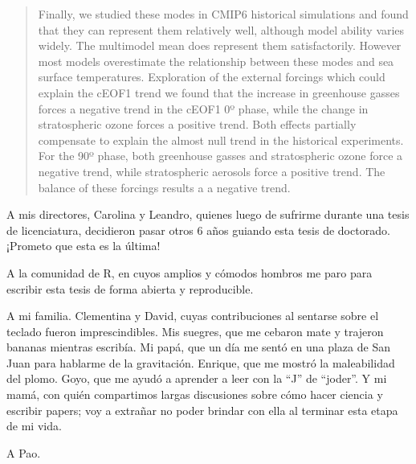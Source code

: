 \documentclass[12pt,oneside,a4paper]{reedthesis}
\begin{document}
\begin{abstract}
    Finally, we studied these modes in CMIP6 historical simulations and found that they can represent them relatively well, although model ability varies widely.
    The multimodel mean does represent them satisfactorily.
    However most models overestimate the relationship between these modes and sea surface temperatures.
    Exploration of the external forcings which could explain the cEOF1 trend we found that the increase in greenhouse gasses forces a negative trend in the cEOF1 0º phase, while the change in stratospheric ozone forces a positive trend.
    Both effects partially compensate to explain the almost null trend in the historical experiments.
    For the 90º phase, both greenhouse gasses and stratospheric ozone force a negative trend, while stratospheric aerosols force a positive trend.
    The balance of these forcings results a a negative trend.
  \end{abstract}



  \begin{acknowledgements}
    A mis directores, Carolina y Leandro, quienes luego de sufrirme durante una tesis de licenciatura, decidieron pasar otros 6 años guiando esta tesis de doctorado.
    ¡Prometo que esta es la última!

    A la comunidad de R, en cuyos amplios y cómodos hombros me paro para escribir esta tesis de forma abierta y reproducible.

    A mi familia.
    Clementina y David, cuyas contribuciones al sentarse sobre el teclado fueron imprescindibles.
    Mis suegres, que me cebaron mate y trajeron bananas mientras escribía.
    Mi papá, que un día me sentó en una plaza de San Juan para hablarme de la gravitación.
    Enrique, que me mostró la maleabilidad del plomo.
    Goyo, que me ayudó a aprender a leer con la ``J'' de ``joder''.
    Y mi mamá, con quién compartimos largas discusiones sobre cómo hacer ciencia y escribir papers; voy a extrañar no poder brindar con ella al terminar esta etapa de mi vida.

    A Pao.
  \end{acknowledgements}


  \hypersetup{linkcolor=black}
  \setcounter{secnumdepth}{2}
  \setcounter{tocdepth}{2}
  \tableofcontents

  \listoftables

  \listoffigures


\mainmatter %
\pagestyle{fancyplain} %
\end{document}
